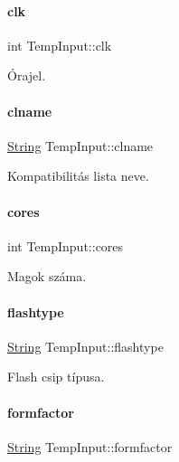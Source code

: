 \paragraph{\texorpdfstring{clk}{clk}}
{\footnotesize\ttfamily int Temp\+Input\+::clk}



Órajel. 

\mbox{\label{struct_temp_input_a623b1fe5692319aad5c58cbc42bedf9c}} 
\paragraph{\texorpdfstring{clname}{clname}}
{\footnotesize\ttfamily \mbox{\hyperlink{class_string}{String}} Temp\+Input\+::clname}



Kompatibilitás lista neve. 

\mbox{\label{struct_temp_input_a9b99532e6c984fb19c34ed943a6d5750}} 
\paragraph{\texorpdfstring{cores}{cores}}
{\footnotesize\ttfamily int Temp\+Input\+::cores}



Magok száma. 

\mbox{\label{struct_temp_input_aca0d9830369aab845fc274c6b54ffe33}} 
\paragraph{\texorpdfstring{flashtype}{flashtype}}
{\footnotesize\ttfamily \mbox{\hyperlink{class_string}{String}} Temp\+Input\+::flashtype}



Flash csip típusa. 

\mbox{\label{struct_temp_input_a402c6984d9e94d4c76e460d0368613f3}} 
\paragraph{\texorpdfstring{formfactor}{formfactor}}
{\footnotesize\ttfamily \mbox{\hyperlink{class_string}{String}} Temp\+Input\+::formfactor}



